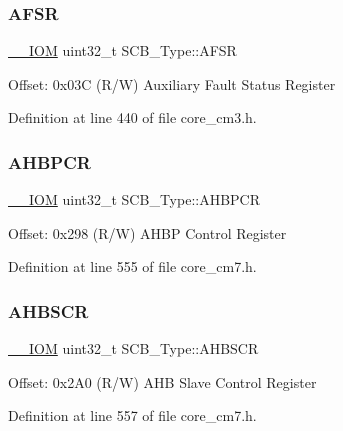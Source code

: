 \subsubsection{\texorpdfstring{A\+F\+SR}{AFSR}}
{\footnotesize\ttfamily \hyperlink{core__sc300_8h_ab6caba5853a60a17e8e04499b52bf691}{\+\_\+\+\_\+\+I\+OM} uint32\+\_\+t S\+C\+B\+\_\+\+Type\+::\+A\+F\+SR}

Offset\+: 0x03C (R/W) Auxiliary Fault Status Register 

Definition at line 440 of file core\+\_\+cm3.\+h.

\mbox{\label{struct_s_c_b___type_a0d53bcea294422b5b4ecfdcd9cdc1773}} 
\subsubsection{\texorpdfstring{A\+H\+B\+P\+CR}{AHBPCR}}
{\footnotesize\ttfamily \hyperlink{core__sc300_8h_ab6caba5853a60a17e8e04499b52bf691}{\+\_\+\+\_\+\+I\+OM} uint32\+\_\+t S\+C\+B\+\_\+\+Type\+::\+A\+H\+B\+P\+CR}

Offset\+: 0x298 (R/W) A\+H\+BP Control Register 

Definition at line 555 of file core\+\_\+cm7.\+h.

\mbox{\label{struct_s_c_b___type_a8c9d9eac30594dd061d34cfaacd5e4bb}} 
\subsubsection{\texorpdfstring{A\+H\+B\+S\+CR}{AHBSCR}}
{\footnotesize\ttfamily \hyperlink{core__sc300_8h_ab6caba5853a60a17e8e04499b52bf691}{\+\_\+\+\_\+\+I\+OM} uint32\+\_\+t S\+C\+B\+\_\+\+Type\+::\+A\+H\+B\+S\+CR}

Offset\+: 0x2\+A0 (R/W) A\+HB Slave Control Register 

Definition at line 557 of file core\+\_\+cm7.\+h.

\mbox{\label{struct_s_c_b___type_ad3e5b8934c647eb1b7383c1894f01380}} 
